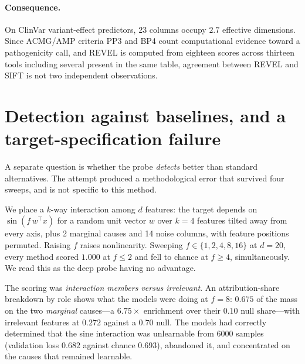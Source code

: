 \paragraph{Consequence.} On ClinVar variant-effect predictors, 23 columns occupy
$2.7$ effective dimensions. Since ACMG/AMP criteria PP3 and BP4 count
computational evidence toward a pathogenicity call, and REVEL is computed from
eighteen scores across thirteen tools including several present in the same
table, agreement between REVEL and SIFT is not two independent observations.

\section{Detection against baselines, and a target-specification failure}
\label{sec:detect}

A separate question is whether the probe \emph{detects} better than standard
alternatives. The attempt produced a methodological error that survived four
sweeps, and is not specific to this method.

We place a $k$-way interaction among $d$ features: the target depends on
$\sin(f\, w^\top x)$ for a random unit vector $w$ over $k=4$ features tilted
away from every axis, plus 2 marginal causes and 14 noise columns, with feature
positions permuted. Raising $f$ raises nonlinearity. Sweeping
$f \in \{1,2,4,8,16\}$ at $d=20$, every method scored $1.000$ at $f \le 2$ and
fell to chance at $f \ge 4$, simultaneously. We read this as the deep probe
having no advantage.

The scoring was \emph{interaction members versus irrelevant}. An
attribution-share breakdown by role shows what the models were doing at $f=8$:
$0.675$ of the mass on the two \emph{marginal} causes---a $6.75\times$
enrichment over their $0.10$ null share---with irrelevant features at $0.272$
against a $0.70$ null. The models had correctly determined that the sine
interaction was unlearnable from 6000 samples (validation loss $0.682$ against
chance $0.693$), abandoned it, and concentrated on the causes that remained
learnable.

